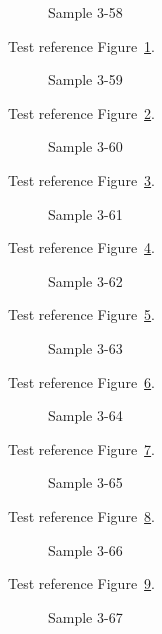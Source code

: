 \begin{figure}[tbhp]
\caption{Sample 3-58}
\label{fig:sample-3-58}
\end{figure}

Test reference Figure~\ref{fig:sample-3-58}.

\begin{figure}[tbhp]
\caption{Sample 3-59}
\label{fig:sample-3-59}
\end{figure}

Test reference Figure~\ref{fig:sample-3-59}.

\begin{figure}[tbhp]
\caption{Sample 3-60}
\label{fig:sample-3-60}
\end{figure}

Test reference Figure~\ref{fig:sample-3-60}.

\begin{figure}[tbhp]
\caption{Sample 3-61}
\label{fig:sample-3-61}
\end{figure}

Test reference Figure~\ref{fig:sample-3-61}.

\begin{figure}[tbhp]
\caption{Sample 3-62}
\label{fig:sample-3-62}
\end{figure}

Test reference Figure~\ref{fig:sample-3-62}.

\begin{figure}[tbhp]
\caption{Sample 3-63}
\label{fig:sample-3-63}
\end{figure}

Test reference Figure~\ref{fig:sample-3-63}.

\begin{figure}[tbhp]
\caption{Sample 3-64}
\label{fig:sample-3-64}
\end{figure}

Test reference Figure~\ref{fig:sample-3-64}.

\begin{figure}[tbhp]
\caption{Sample 3-65}
\label{fig:sample-3-65}
\end{figure}

Test reference Figure~\ref{fig:sample-3-65}.

\begin{figure}[tbhp]
\caption{Sample 3-66}
\label{fig:sample-3-66}
\end{figure}

Test reference Figure~\ref{fig:sample-3-66}.

\begin{figure}[tbhp]
\caption{Sample 3-67}
\label{fig:sample-3-67}
\end{figure}

